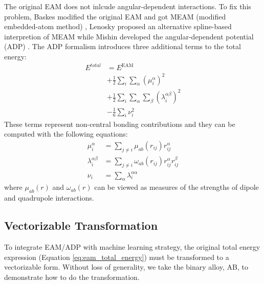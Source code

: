 \documentclass[final,3p,times]{elsarticle}
\begin{document}
The original EAM does not inlcude angular-dependent interactions. To 
fix this problem, Baskes modified the original EAM and got MEAM (modified 
embedded-atom method) \cite{MEAM0}, Lenosky proposed an alternative spline-based 
interpretion of MEAM \cite{MEAM_Lenosky} while Mishin developed the 
angular-dependent potential (ADP) \cite{ADP0,ADP1,ADP2,ADP3,ADP4}. The ADP 
formalism introduces three additional terms to the total energy:
\begin{align}
\label{eq:adp}
E^{total} 
& = E^{\mathrm{EAM}} \nonumber \\
& + \frac{1}{2}\sum_{i}{\sum_{\alpha}{(\mu_{i}^{\alpha})^2}} \nonumber \\
& + \frac{1}{2}\sum_{i}{
    \sum_{\alpha}{\sum_{\beta}{(\lambda_{i}^{\alpha\beta})^2}}} \nonumber \\
& - \frac{1}{6}\sum_{i}{\nu_{i}^{2}}
\end{align}
These terms represent non-central bonding contributions and they can be computed
with the following equations:
\begin{align}
\label{eq:adp_mu}
\mu_{i}^{\alpha} & = \sum_{j \neq i}{\mu_{ab}(r_{ij}) r_{ij}^{\alpha}} \\
\label{eq:adp_lambda}
\lambda_{i}^{\alpha\beta} & = \sum_{j \neq i}{
    \omega_{ab}(r_{ij}) r_{ij}^{\alpha}r_{ij}^{\beta}} \\
\label{eq:adp_nu}
\nu_{i} & = \sum_{\alpha}{\lambda_{i}^{\alpha\alpha}}
\end{align}
where $\mu_{ab}(r)$ and $\omega_{ab}(r)$ can be viewed as measures of the 
strengths of dipole and quadrupole interactions.

\subsection{Vectorizable Transformation}
\label{sec:transformation}

To integrate EAM/ADP with machine learning strategy, the original total energy 
expression (Equation \ref{eq:eam_total_energy}) must be transformed to a 
vectorizable form. Without loss of generality, we take the binary alloy, AB, to 
demonstrate how to do the transformation.

\newcommand{\niaa}{N_{i}^{\mathrm{AA}}}
\newcommand{\niab}{N_{i}^{\mathrm{AB}}}
\newcommand{\njbb}{N_{j}^{\mathrm{BB}}}
\newcommand{\njba}{N_{j}^{\mathrm{BA}}}
\newcommand{\riaa}{\vec{\mathbf{r}}_{i}^{\mathrm{AA}}}
\newcommand{\riab}{\vec{\mathbf{r}}_{i}^{\mathrm{AB}}}
\newcommand{\ribb}{\vec{\mathbf{r}}_{i}^{\mathrm{BB}}}
\newcommand{\riba}{\vec{\mathbf{r}}_{i}^{\mathrm{BA}}}
\newcommand{\namax}{N_{\mathrm{A}}^{\mathrm{max}}}
\newcommand{\nbmax}{N_{\mathrm{B}}^{\mathrm{max}}}
\newcommand{\nnl}{N^{\mathrm{nl}}}
\newcommand{\nnli}{N^{\mathrm{nl}}_i}
\end{document}
